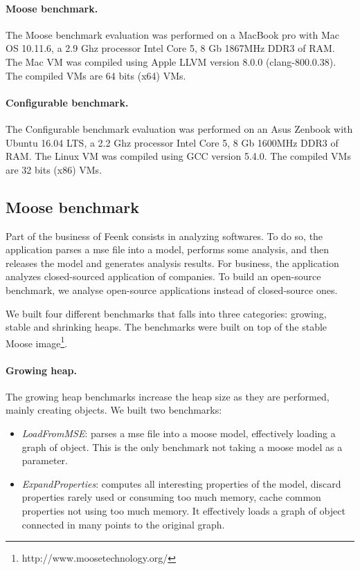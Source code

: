 \documentclass[10pt, sigplan]{acmart}
\begin{document}
\paragraph{Moose benchmark.}The Moose benchmark evaluation was performed on a MacBook pro with Mac OS 10.11.6, a 2.9 Ghz processor Intel Core 5, 8 Gb 1867MHz DDR3 of RAM. The Mac VM was compiled using Apple LLVM version 8.0.0 (clang-800.0.38). The compiled VMs are 64 bits (x64) VMs.

\paragraph{Configurable benchmark.}The Configurable benchmark evaluation was performed on an Asus Zenbook with Ubuntu 16.04 LTS, a 2.2 Ghz processor Intel Core 5, 8 Gb 1600MHz DDR3 of RAM. The Linux VM was compiled using GCC version 5.4.0. The compiled VMs are 32 bits (x86) VMs.

\subsection{Moose benchmark}
\label{sec:mooseBench}

Part of the business of Feenk consists in analyzing softwares. To do so, the application parses a mse file into a model, performs some analysis, and then releases the model and generates analysis results. For business, the application analyzes closed-sourced application of companies. To build an open-source benchmark, we analyse open-source applications instead of closed-source ones.

We built four different benchmarks that falls into three categories: growing, stable and shrinking heaps. The benchmarks were built on top of the stable Moose image\footnote{http://www.moosetechnology.org/}.

\paragraph{Growing heap.} The growing heap benchmarks increase the heap size as they are performed, mainly creating objects. We built two benchmarks:
\begin{itemize}
	\item \emph{LoadFromMSE}: parses a mse file into a moose model, effectively loading a graph of object. This is the only benchmark not taking a moose model as a parameter.
	\item \emph{ExpandProperties}: computes all interesting properties of the model, discard properties rarely used or consuming too much memory, cache common properties not using too much memory. It effectively loads a graph of object connected in many points to the original graph. 
\end{itemize}
\end{document}
